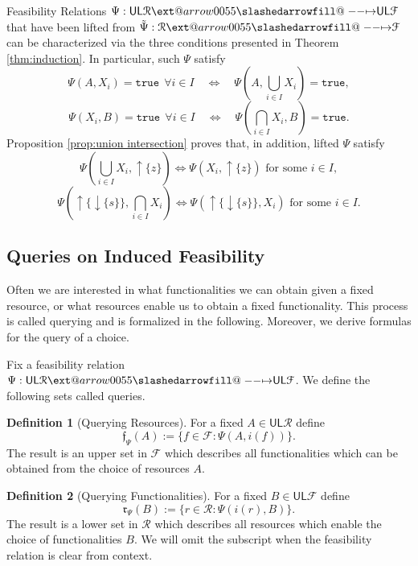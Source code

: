 \documentclass[12pt]{article}
\makeatletter
\theoremstyle{definition}
\newtheorem{definition}{Definition}[section]
\theoremstyle{plain}
\theoremstyle{plain}
\theoremstyle{plain}
\theoremstyle{plain}
\theoremstyle{remark}
\theoremstyle{remark}
\newcommand{\mc}[1]{\mathcal{#1}}
\newcommand{\low}{\mathsf{L}}
\newcommand{\upper}{\mathsf{U}}
\newcommand{\true}{\mathtt{true}}
\newcommand{\upc}[1]{{\uparrow #1}}
\newcommand{\lwc}[1]{{\downarrow #1}}
\def\slashedarrowfill@#1#2#3#4#5{%
	$\m@th\thickmuskip0mu\medmuskip\thickmuskip\thinmuskip\thickmuskip
	\relax#5#1\mkern-7mu%
	\cleaders\hbox{$#5\mkern-2mu#2\mkern-2mu$}\hfill
	\mathclap{#3}\mathclap{#2}%
	\cleaders\hbox{$#5\mkern-2mu#2\mkern-2mu$}\hfill
	\mkern-7mu#4$%
}
\def\rightslashedarrowfill@{%
	\slashedarrowfill@\relbar\relbar\mapstochar\rightarrow}
\newcommand\xslashedrightarrow[2][]{%
	\ext@arrow 0055{\rightslashedarrowfill@}{#1}{#2}}
\makeatother
\begin{document}
\begin{tcolorbox}[title=Characterizing Lifted Feasibility Relations, colframe=Apricot, colback = paleorange, coltitle = Sepia]
	Feasibility Relations $\Psi: \upper\low\mc{R} \xslashedrightarrow{} \upper\low\mc{F}$ that have been lifted from $\tilde\Psi: \mc{R} \xslashedrightarrow{} \mc{F}$ can be characterized via the three conditions presented in Theorem \ref{thm:induction}. In particular,
	such $\Psi$ satisfy
	$$\Psi(A,X_i) = \true \:\: \forall i \in I \quad \Leftrightarrow \quad \Psi(A,\bigcup_{i \in I} X_i) = \true,$$
	$$\Psi(X_i,B) = \true \:\: \forall i \in I \quad \Leftrightarrow \quad \Psi(\bigcap_{i \in I}X_i,B) = \true.$$
	Proposition \ref{prop:union intersection} proves that, in addition, lifted $\Psi$ satisfy
	$$\Psi(\bigcup_{i \in I} X_i, \upc{\{z\}}) \Leftrightarrow \Psi(X_i,\upc{\{z\}}) \text{ for some } i \in I,$$
	$$\Psi(\upc{\{\lwc{\{s\}}\}}, \bigcap_{i \in I}X_i) \Leftrightarrow \Psi(\upc{\{\lwc{\{s\}}\}},X_i) \text{ for some } i \in I.$$
\end{tcolorbox}
\newpage
\subsection{Queries on Induced Feasibility}
Often we are interested in what functionalities we can obtain given a fixed resource, or what resources enable us to obtain a fixed functionality. This process is called querying and is formalized in the following. Moreover, we derive formulas for the query of a choice.

Fix a feasibility relation $\Psi: \upper\low\mc{R} \xslashedrightarrow{} \upper\low\mc{F}$. We define the following sets called queries. 

\begin{definition}[Querying Resources]
	For a fixed $A \in \upper\low\mc{R}$ define 
	$$\mathfrak{f}_\Psi(A) := \{f \in \mc{F} : \Psi(A,i(f)) \}.$$
	The result is an upper set in $\mc{F}$ which describes all functionalities which can be obtained from the choice of resources $A$.
\end{definition}

\begin{definition}[Querying Functionalities]
	For a fixed $B \in \upper\low\mc{F}$ define 
	$$\mathfrak{r}_\Psi(B) := \{r \in \mc{R} : \Psi(i(r),B) \}.$$
	The result is a lower set in $\mc{R}$ which describes all resources which enable the choice of functionalities $B$. We will omit the subscript when the feasibility relation is clear from context.
\end{definition}
\end{document}
